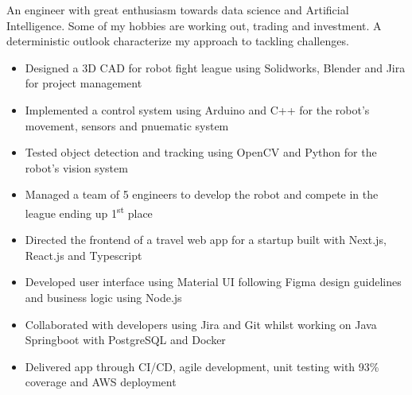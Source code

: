 \documentclass[11pt,a4paper,ragged2e]{altacv}
\begin{document}
\begin{paracol}{1}
\smallskip
{}

An engineer with great enthusiasm towards data science and Artificial Intelligence. Some of my hobbies are working out, trading and investment. A deterministic outlook characterize my approach to tackling challenges.\smallskip




\begin{itemize}
\item Designed a 3D CAD for robot fight league using Solidworks, Blender and Jira for project management
\item Implemented a control system using Arduino and C++ for the robot's movement, sensors and pnuematic system
\item Tested object detection and tracking using OpenCV and Python for the robot's vision system
\item Managed a team of 5 engineers to develop the robot and compete in the league ending up 1\textsuperscript{st} place
\end{itemize}
\tightdivider

\begin{itemize}
\item Directed the frontend of a travel web app for a startup built with Next.js, React.js and Typescript
\item Developed user interface using Material UI following Figma design guidelines and business logic using Node.js
\item Collaborated with developers using Jira and Git whilst working on Java Springboot with PostgreSQL and Docker
\item Delivered app through CI/CD, agile development, unit testing with 93\% coverage and AWS deployment
\end{itemize}
\tightdivider


\end{paracol}
\end{document}
